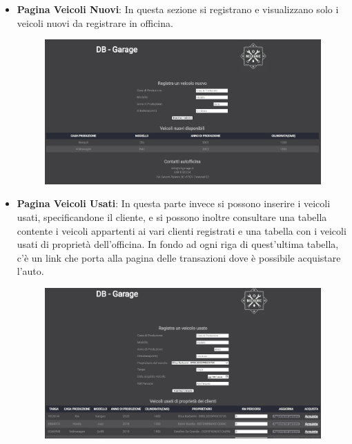 \documentclass[a4paper,12pt]{report}
\begin{document}
\begin{itemize}
	\item \textbf{Pagina Veicoli Nuovi}:
	In questa sezione si registrano e visualizzano solo i veicoli nuovi da registrare in officina.
	\begin{figure}[H]
		\centering
		\includegraphics[scale=0.46]{img/veicoli_nuovi.jpg}
	\end{figure}

	\item \textbf{Pagina Veicoli Usati}:
	In questa parte invece si possono inserire i veicoli usati, specificandone il cliente, e si possono inoltre 
	consultare una tabella contente i veicoli appartenti ai vari clienti registrati e una tabella con i veicoli
	usati di proprietà dell'officina. In fondo ad ogni riga di quest'ultima tabella, c'è un link che porta alla pagina
	delle transazioni dove è possibile acquistare l'auto.
	\begin{figure}[H]
		\centering
		\includegraphics[scale=0.46]{img/veicoli_usati.jpg}
	\end{figure}

\end{itemize}
\end{document}
